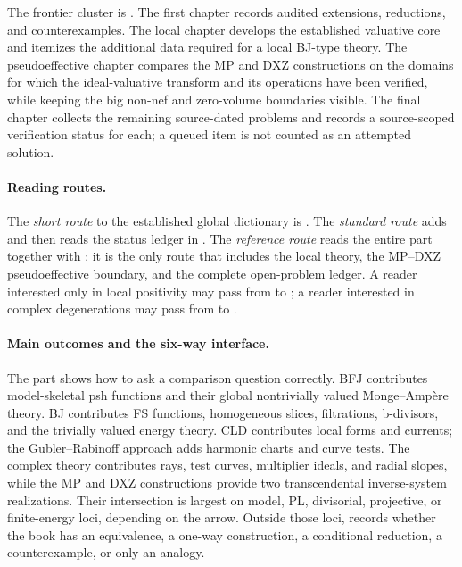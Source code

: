 The frontier cluster is
.
The first chapter records audited extensions, reductions, and
counterexamples.  The local chapter develops the established valuative core
and itemizes the additional data required for a local BJ-type theory.  The
pseudoeffective chapter compares the MP and DXZ constructions on the domains
for which the ideal-valuative transform and its operations have been
verified, while keeping the big non-nef and zero-volume boundaries visible.
The final chapter collects the remaining source-dated problems and records a
source-scoped verification status for each; a queued item is not counted as
an attempted solution.

\paragraph{Reading routes.}
\label{front:part6-reading-routes}
The \emph{short route} to the established global dictionary is
.  The
\emph{standard route} adds
 and then
reads the status ledger in .  The
\emph{reference route} reads the entire part together with
; it is the only route that includes
the local theory, the MP--DXZ pseudoeffective boundary, and the complete
open-problem ledger.  A reader interested only in local positivity may pass
from  to
; a reader interested
in complex degenerations may pass from  to
.

\paragraph{Main outcomes and the six-way interface.}
\label{front:part6-main-outcomes-and-the-six-way-interface}
The part shows how to ask a comparison question correctly.  BFJ contributes
model-skeletal psh functions and their global nontrivially valued
Monge--Amp\`ere theory. BJ contributes FS functions, homogeneous slices,
filtrations, b-divisors, and the trivially valued energy theory.  CLD
contributes local forms and currents; the Gubler--Rabinoff approach adds
harmonic charts and curve tests.  The complex theory contributes rays, test
curves, multiplier ideals, and radial slopes, while the MP and DXZ
constructions provide two transcendental inverse-system realizations.  Their
intersection is largest on model, PL, divisorial, projective, or
finite-energy loci, depending on the arrow.  Outside those loci,
records whether the book has an equivalence, a one-way construction, a
conditional reduction, a counterexample, or only an analogy.

